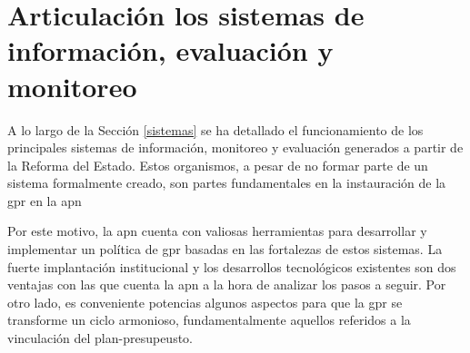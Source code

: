\newpage
\section{Articulación los sistemas de información, evaluación y monitoreo} \label{articulacion}

A lo largo de la Sección \ref{sistemas} se ha detallado el funcionamiento de los principales sistemas de información, monitoreo y evaluación generados a partir de la Reforma del Estado. Estos organismos, a pesar de no formar parte de un sistema formalmente creado, son partes fundamentales en la instauración de la \ac{gpr} en la \ac{apn}

Por este motivo, la \ac{apn} cuenta con valiosas herramientas para desarrollar y implementar un política de \ac{gpr} basadas en las fortalezas de estos sistemas. La fuerte implantación institucional y los desarrollos tecnológicos existentes son dos ventajas con las que cuenta la \ac{apn} a la hora de analizar los pasos a seguir. Por otro lado, es conveniente potencias algunos aspectos para que la \ac{gpr} se transforme un ciclo armonioso, fundamentalmente aquellos referidos a la vinculación del plan-presupeusto.

